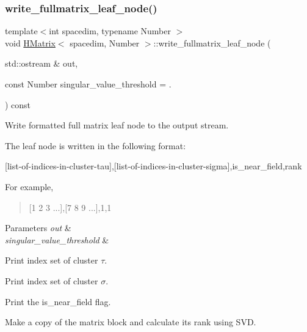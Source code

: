 \mbox{\label{classHMatrix_a42f958a13c56d64564d59487e67bc8a2}} 
\subsubsection{\texorpdfstring{write\+\_\+fullmatrix\+\_\+leaf\+\_\+node()}{write\_fullmatrix\_leaf\_node()}}
{\footnotesize\ttfamily template$<$int spacedim, typename Number $>$ \\
void \hyperlink{classHMatrix}{H\+Matrix}$<$ spacedim, Number $>$\+::write\+\_\+fullmatrix\+\_\+leaf\+\_\+node (\begin{DoxyParamCaption}\item[{std\+::ostream \&}]{out,  }\item[{const Number}]{singular\+\_\+value\+\_\+threshold = {.} }\end{DoxyParamCaption}) const}

Write formatted full matrix leaf node to the output stream.

The leaf node is written in the following format\+:

\begin{quote}


\end{quote}
\mbox{[}list-\/of-\/indices-\/in-\/cluster-\/tau\mbox{]},\mbox{[}list-\/of-\/indices-\/in-\/cluster-\/sigma\mbox{]},is\+\_\+near\+\_\+field,rank

For example,

\begin{quote}
\mbox{[}1 2 3 ...\mbox{]},\mbox{[}7 8 9 ...\mbox{]},1,1 \end{quote}



\begin{DoxyParams}{Parameters}
{\em out} & \\
\hline
{\em singular\+\_\+value\+\_\+threshold} & \\
\hline
\end{DoxyParams}
Print index set of cluster $\tau$.

Print index set of cluster $\sigma$.

Print the {\ttfamily is\+\_\+near\+\_\+field} flag.

Make a copy of the matrix block and calculate its rank using S\+VD.

